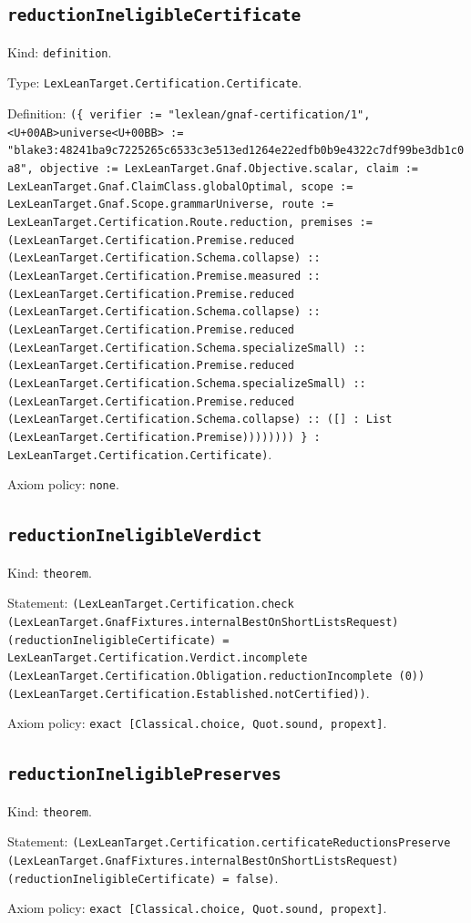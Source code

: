 \documentclass[11pt]{article}
\begin{document}
\subsection*{\texttt{reductionIneligibleCertificate}}
\noindent Kind: \texttt{definition}.\par
\noindent Type: \texttt{LexLeanTarget.Certification.Certificate}.\par
\noindent Definition: \texttt{(\{ verifier := "lexlean/gnaf-certification/1", <U+00AB>universe<U+00BB> := "blake3:48241ba9c7225265c6533c3e513ed1264e22edfb0b9e4322c7df99be3db1c0a8", objective := LexLeanTarget.Gnaf.Objective.scalar, claim := LexLeanTarget.Gnaf.ClaimClass.globalOptimal, scope := LexLeanTarget.Gnaf.Scope.grammarUniverse, route := LexLeanTarget.Certification.Route.reduction, premises := (LexLeanTarget.Certification.Premise.reduced (LexLeanTarget.Certification.Schema.collapse) :: (LexLeanTarget.Certification.Premise.measured :: (LexLeanTarget.Certification.Premise.reduced (LexLeanTarget.Certification.Schema.collapse) :: (LexLeanTarget.Certification.Premise.reduced (LexLeanTarget.Certification.Schema.specializeSmall) :: (LexLeanTarget.Certification.Premise.reduced (LexLeanTarget.Certification.Schema.specializeSmall) :: (LexLeanTarget.Certification.Premise.reduced (LexLeanTarget.Certification.Schema.collapse) :: ([] : List (LexLeanTarget.Certification.Premise)))))))) \} : LexLeanTarget.Certification.Certificate)}.\par
\noindent Axiom policy: \texttt{none}.\par
\subsection*{\texttt{reductionIneligibleVerdict}}
\noindent Kind: \texttt{theorem}.\par
\noindent Statement: \texttt{(LexLeanTarget.Certification.check (LexLeanTarget.GnafFixtures.internalBestOnShortListsRequest) (reductionIneligibleCertificate) = LexLeanTarget.Certification.Verdict.incomplete (LexLeanTarget.Certification.Obligation.reductionIncomplete (0)) (LexLeanTarget.Certification.Established.notCertified))}.\par
\noindent Axiom policy: \texttt{exact [Classical.choice, Quot.sound, propext]}.\par
\subsection*{\texttt{reductionIneligiblePreserves}}
\noindent Kind: \texttt{theorem}.\par
\noindent Statement: \texttt{(LexLeanTarget.Certification.certificateReductionsPreserve (LexLeanTarget.GnafFixtures.internalBestOnShortListsRequest) (reductionIneligibleCertificate) = false)}.\par
\noindent Axiom policy: \texttt{exact [Classical.choice, Quot.sound, propext]}.\par
\end{document}
